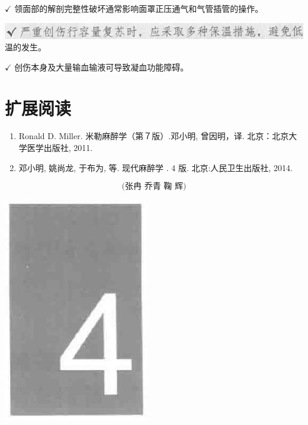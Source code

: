 \documentclass[10pt]{article}
\begin{document}
$\checkmark$ 领面部的解剖完整性破坏通常影响面罩正压通气和气管插管的操作。

\includegraphics[max width=\textwidth, center]{2024_07_05_645bb794a4d4f32ee0c8g-259(1)}\\
温的发生。

$\checkmark$ 创伤本身及大量输血输液可导致凝血功能障碍。

\section*{扩展阅读}
\begin{enumerate}
  \item Ronald D. Miller. 米勒麻醉学（第７版）.邓小明, 曾因明，译. 北京：北京大学医学出版社, 2011.

  \item 邓小明, 姚尚龙, 于布为, 等. 现代麻醉学 . 4 版. 北京:人民卫生出版社, 2014.

\end{enumerate}

\[
\text { (张冉 乔青 鞠 辉) }
\]

\begin{center}
\includegraphics[max width=\textwidth]{2024_07_05_645bb794a4d4f32ee0c8g-261}
\end{center}
\end{document}
